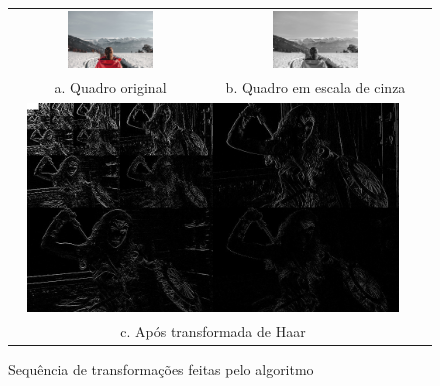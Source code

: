 \begin{figure}[h]
  \centering
  \begin{tabular}{ccc}
    \centering
    \includegraphics[width=0.45\textwidth]{dados/figuras/original} & \includegraphics[width=0.45\textwidth]{dados/figuras/original_bw} \\ 
     a. Quadro original & b. Quadro em escala de cinza \\
    \multicolumn{2}{c}{\includegraphics[width=0.94\textwidth]{dados/figuras/ww_haar_}} \\
    \multicolumn{2}{c}{c. Após transformada de Haar}
  \end{tabular}
  \caption{Sequência de transformações feitas pelo algoritmo}
  \label{figure:haar}
\end{figure}

